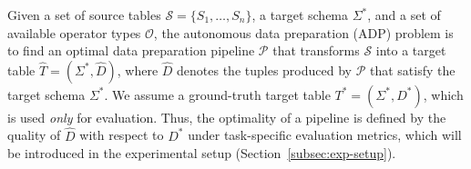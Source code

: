 Given a set of source tables $\mathcal{S} = \{S_1, \ldots, S_n\}$, a target schema $\Sigma^{\ast}$, and a set of available operator types $\mathcal{O}$, the autonomous data preparation (ADP) problem is to find an optimal data preparation pipeline $\mathcal{P}$ that transforms $\mathcal{S}$ into a target table $\hat{T} = (\Sigma^{\ast}, \hat{D})$, where $\hat{D}$ denotes the tuples produced by $\mathcal{P}$ that satisfy the target schema $\Sigma^{\ast}$.
We assume a ground-truth target table $T^\ast=(\Sigma^\ast, D^\ast)$, which is used \emph{only} for evaluation. Thus, the optimality of a pipeline is defined by the quality of $\hat{D}$ with respect to $D^\ast$ under task-specific evaluation metrics, which will be introduced in the experimental setup (Section~\ref{subsec:exp-setup}).
%
\begin{example}


\end{example}
